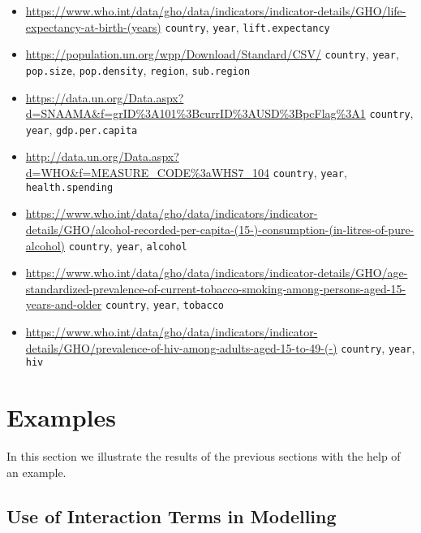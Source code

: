 \documentclass[
  a4paper,
]{article}
\providecommand{\tightlist}{%
  \setlength{\itemsep}{0pt}\setlength{\parskip}{0pt}}
\theoremstyle{definition}
\theoremstyle{definition}
\theoremstyle{definition}
\theoremstyle{definition}
\theoremstyle{remark}
\begin{document}
\begin{itemize}
\tightlist
\item
  \url{https://www.who.int/data/gho/data/indicators/indicator-details/GHO/life-expectancy-at-birth-(years)}
  \texttt{country}, \texttt{year}, \texttt{lift.expectancy}
\item
  \url{https://population.un.org/wpp/Download/Standard/CSV/}
  \texttt{country}, \texttt{year}, \texttt{pop.size}, \texttt{pop.density}, \texttt{region}, \texttt{sub.region}
\item
  \url{https://data.un.org/Data.aspx?d=SNAAMA\&f=grID\%3A101\%3BcurrID\%3AUSD\%3BpcFlag\%3A1}
  \texttt{country}, \texttt{year}, \texttt{gdp.per.capita}
\item
  \url{http://data.un.org/Data.aspx?d=WHO\&f=MEASURE_CODE\%3aWHS7_104}
  \texttt{country}, \texttt{year}, \texttt{health.spending}
\item
  \url{https://www.who.int/data/gho/data/indicators/indicator-details/GHO/alcohol-recorded-per-capita-(15-)-consumption-(in-litres-of-pure-alcohol)}
  \texttt{country}, \texttt{year}, \texttt{alcohol}
\item
  \url{https://www.who.int/data/gho/data/indicators/indicator-details/GHO/age-standardized-prevalence-of-current-tobacco-smoking-among-persons-aged-15-years-and-older}
  \texttt{country}, \texttt{year}, \texttt{tobacco}
\item
  \url{https://www.who.int/data/gho/data/indicators/indicator-details/GHO/prevalence-of-hiv-among-adults-aged-15-to-49-(-)}
  \texttt{country}, \texttt{year}, \texttt{hiv}
\end{itemize}

\clearpage

\hypertarget{S16-examples}{%
\section{Examples}\label{S16-examples}}

In this section we illustrate the results of the previous sections
with the help of an example.

\hypertarget{interactions-example}{%
\subsection{Use of Interaction Terms in Modelling}\label{interactions-example}}
\end{document}
